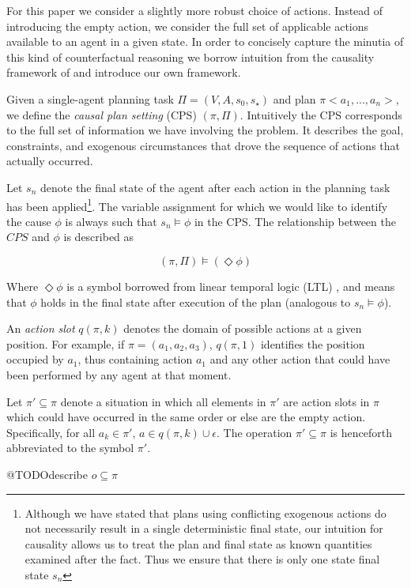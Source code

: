 \documentclass{article}
\theoremstyle{plain}
\theoremstyle{definition}
\begin{document}
For this paper we consider a slightly more robust choice of actions. Instead of introducing the empty action, we consider the full set of applicable actions available to an agent in a given state. In order to concisely capture the minutia of this kind of counterfactual reasoning we borrow intuition from the causality framework of \cite{halpern2005causes} and introduce our own framework.

Given a single-agent planning task $\Pi=(V, A, s_0, s_\star)$ and plan $\pi<a_1,...,a_n>$, we define the \textit{causal plan setting} (CPS) $(\pi,\Pi)$. Intuitively the CPS corresponds to the full set of information we have involving the problem. It describes the goal, constraints, and exogenous circumstances that drove the sequence of actions that actually occurred.

Let $s_n$ denote the final state of the agent after each action in the planning task has been applied\footnote{Although we have stated that plans using conflicting exogenous actions do not necessarily result in a single deterministic final state, our intuition for causality allows us to treat the plan and final state as known quantities examined after the fact. Thus we ensure that there is only one state final state $s_n$}. The variable assignment for which we would like to identify the cause $\phi$ is always such that $s_n \models \phi$ in the CPS. The relationship between the $CPS$ and $\phi$ is described as

\[
(\pi, \Pi) \models (\Diamond \phi)
\]

Where $\Diamond \phi$ is a symbol borrowed from linear temporal logic (LTL) \cite{galton1987temporal}, and means that $\phi$ holds in the final state after execution of the plan (analogous to $s_n \models \phi$).

An \textit{action slot} $q(\pi,k)$ denotes the domain of possible actions at a given position. For example, if $\pi=(a_1,a_2,a_3)$, $q(\pi,1)$ identifies the position occupied by $a_1$, thus containing action $a_1$ and any other action that could have been performed by any agent at that moment.

Let $\pi'\subseteq \pi$ denote a situation in which all elements in $\pi'$ are action slots in $\pi$ which could have occurred in the same order or else are the empty action. Specifically, for all $a_k \in \pi'$, $a \in q(\pi,k) \cup \epsilon$. The operation $\pi'\subseteq \pi$ is henceforth abbreviated to the symbol $\pi'$.

@TODOdescribe $o \subseteq \pi$
\end{document}
